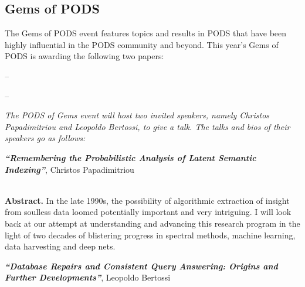 
\clearpage

\subsection*{Gems of PODS}

The Gems of PODS event features topics and results in PODS that have been highly influential in the PODS community and beyond. This year's Gems of PODS is awarding the following two papers:

\vspace{1.5mm}

-- \vspace{1mm}

-- 



\vspace{5mm}

\emph{The PODS of Gems event will host two invited speakers, namely Christos Papadimitriou and Leopoldo Bertossi, to give a talk. The talks and bios of their speakers go as follows:}



{
\center
\textbf{\emph{``Remembering the Probabilistic Analysis of Latent Semantic Indexing''}}, Christos Papadimitriou \\~\\
}

\textbf{Abstract.} In the late 1990s, the possibility of algorithmic extraction of insight from soulless data loomed potentially important and very intriguing. I will look back at our attempt at understanding and advancing this research program in the light of two decades of blistering progress in spectral methods, machine learning, data harvesting and deep nets.


\vspace{2mm}

{
\center
\textbf{\emph{``Database Repairs and Consistent Query Answering: Origins and Further Developments''}}, Leopoldo Bertossi \\~\\
}

